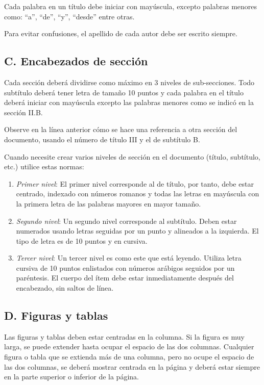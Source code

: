 ﻿\documentclass[10pt,twocolumn]{article}
\begin{document}
Cada palabra en un título debe iniciar con mayúscula, excepto palabras menores como: “a”, “de”, “y”, “desde” entre otras.

Para evitar confusiones, el apellido de cada autor debe ser escrito siempre.

\subsection*{C. Encabezados de sección}
Cada sección deberá dividirse como máximo en 3 niveles de sub-secciones. Todo subtítulo deberá tener letra de tamaño 10 puntos y cada palabra en el título deberá iniciar con mayúscula excepto las palabras menores como se indicó en la sección II.B.

Observe en la línea anterior cómo se hace una referencia a otra sección del documento, usando el número de título III y el de subtítulo B.

Cuando necesite crear varios niveles de sección en el documento (título, subtítulo, etc.) utilice estas normas:
\begin{enumerate}[leftmargin=*,label=\roman*.]
  \item \textit{Primer nivel}: El primer nivel corresponde al de título, por tanto, debe estar centrado, indexado con números romanos y todas las letras en mayúscula con la primera letra de las palabras mayores en mayor tamaño.
  \item \textit{Segundo nivel}: Un segundo nivel corresponde al subtítulo. Deben estar numerados usando letras seguidas por un punto y alineados a la izquierda. El tipo de letra es de 10 puntos y en cursiva.
  \item \textit{Tercer nivel}: Un tercer nivel es como este que está leyendo. Utiliza letra cursiva de 10 puntos enlistados con números arábigos seguidos por un paréntesis. El cuerpo del ítem debe estar inmediatamente después del encabezado, sin saltos de línea.
\end{enumerate}

\subsection*{D. Figuras y tablas}
Las figuras y tablas deben estar centradas en la columna. Si la figura es muy larga, se puede extender hasta ocupar el espacio de las dos columnas. Cualquier figura o tabla que se extienda más de una columna, pero no ocupe el espacio de las dos columnas, se deberá mostrar centrada en la página y deberá estar siempre en la parte superior o inferior de la página.
\end{document}
